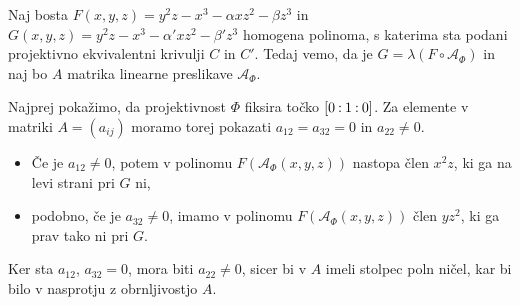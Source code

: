 \documentclass[mat1]{fmfdelo}
\numberwithin{equation}{section}
\newcommand{\linphi}{\mathcal{A}_\Phi}
\newcommand{\oio}{\pcoor{0: 1 : 0}}
\newcommand{\pcoor}[1]{%
\begingroup\lccode`~=`: \lowercase{\endgroup
\edef~}{\mathbin{\mathchar\the\mathcode`:}\nobreak}%
\left[%
\begingroup
\mathcode`:=\string"8000
#1%
\endgroup
\right]%
}
\theoremstyle{definition}
\begin{document}
\begin{dokaz}
    Naj bosta $F(x,y,z) = y^2z - x^3 - \alpha xz^2 - \beta z^3$ in $G(x, y, z) = y^2z - x^3 - \alpha' xz^2 - \beta' z^3$ homogena polinoma, s katerima sta podani projektivno ekvivalentni krivulji $C$ in $C'$. Tedaj vemo, da je $G = \lambda(F \circ \linphi)$ in naj bo $A$ matrika linearne preslikave $\linphi$.
    
    Najprej pokažimo, da projektivnost $\Phi$ fiksira točko $\oio$. Za elemente v matriki $A = (a_{ij})$ moramo torej pokazati $a_{12} = a_{32} = 0$ in $a_{22} \neq 0$. 
    \begin{itemize}
        \item Če je $a_{12} \neq 0$, potem v polinomu $F(\linphi(x,y,z))$ nastopa člen $x^2z$, ki ga na levi strani pri $G$ ni, 
        \item podobno, če je $a_{32} \neq 0$, imamo v polinomu $F(\linphi(x,y,z))$ člen $yz^2$, ki ga prav tako ni pri $G$. 
    \end{itemize}
    Ker sta $a_{12}$, $a_{32} = 0$, mora biti $a_{22} \neq 0$, sicer bi v $A$ imeli stolpec poln ničel, kar bi bilo v nasprotju z obrnljivostjo $A$. 
    

\end{dokaz}
\end{document}
